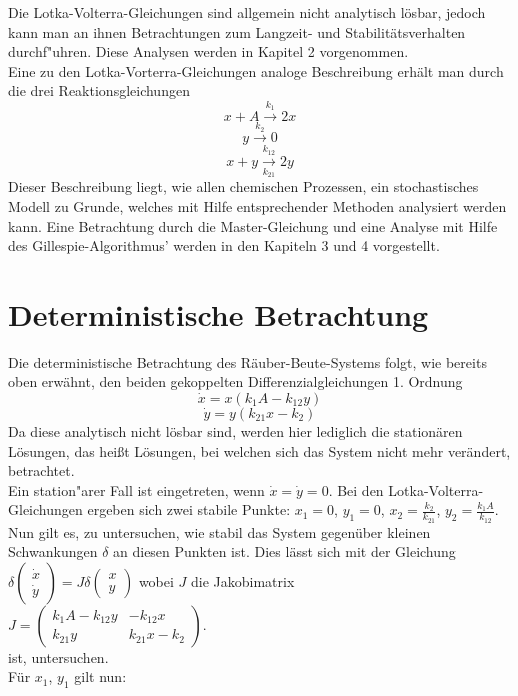 \documentclass[11pt]{article}
\begin{document}
Die Lotka-Volterra-Gleichungen sind allgemein nicht analytisch lösbar, jedoch kann man an ihnen Betrachtungen zum Langzeit- und Stabilitätsverhalten durchf"uhren. Diese Analysen werden in Kapitel 2 vorgenommen.\\
Eine zu den Lotka-Vorterra-Gleichungen analoge Beschreibung erhält man durch die drei Reaktionsgleichungen
$$x+A \xrightarrow{k_1} 2x $$
$$y  \xrightarrow{k_2}0$$
$$x+y \xrightarrow[k_{21}]{k_{12}} 2y $$
Dieser Beschreibung liegt, wie allen chemischen Prozessen, ein stochastisches Modell zu Grunde, welches mit Hilfe entsprechender Methoden analysiert werden kann. Eine Betrachtung durch die Master-Gleichung und eine Analyse mit Hilfe des Gillespie-Algorithmus' werden in den Kapiteln 3 und 4 vorgestellt.

\section{Deterministische Betrachtung}
Die deterministische Betrachtung des Räuber-Beute-Systems folgt, wie bereits oben erwähnt, den beiden gekoppelten Differenzialgleichungen 1. Ordnung
$$\dot x=x(k_1 A-k_{12}y)$$
$$\dot y=y(k_{21}x-k_2)$$
Da diese analytisch nicht lösbar sind, werden hier lediglich die stationären Lösungen, das heißt Lösungen, bei welchen sich das System nicht mehr verändert, betrachtet.\\
Ein station"arer Fall ist eingetreten, wenn  $\dot x=\dot y=0$. Bei den Lotka-Volterra-Gleichungen ergeben sich zwei stabile Punkte: 
 $x_1=0$, $y_1=0$, $x_2=\frac{k_2}{k_{21}}$, $y_2=\frac{k_1 A}{k_{12}}$.\\
Nun gilt es, zu untersuchen, wie stabil das System gegenüber kleinen Schwankungen $\delta$ an diesen Punkten ist. Dies lässt sich mit der Gleichung
$\delta \begin{pmatrix} \dot x \\ \dot y \end{pmatrix}=J\delta \begin{pmatrix} x \\ y \end{pmatrix}$ wobei $J$ die Jakobimatrix\\
$J=\begin{pmatrix} k_1A-k_{12}y & -k_{12}x \\ k_{21}y & k_{21}x-k_2 \end{pmatrix}$.\vspace{3mm} \\
ist, untersuchen.\\
Für $x_1$, $y_1$ gilt nun:\\
\vspace{3mm}
\end{document}
